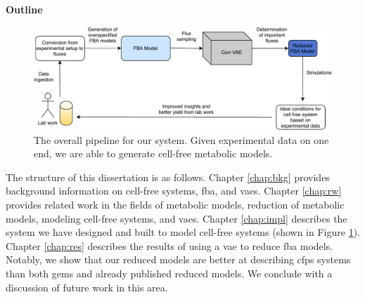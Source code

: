 \textbf{Outline}
\begin{figure}[t!]
\begin{center}
\includegraphics[width=\textwidth]{figs/SystemOverview.pdf}
\end{center}
\caption[The overall pipeline for our system]{The overall pipeline for our system.
Given experimental data on one end, we are able to generate cell-free metabolic models.}
\label{fig:overview}
\end{figure}

The structure of this dissertation is as follows.
Chapter \ref{chap:bkg} provides background information on cell-free systems, \gls{fba}, and \glspl{vae}.
Chapter \ref{chap:rw} provides related work in the fields of metabolic models, reduction of metabolic models, modeling cell-free systems, and \glspl{vae}.
Chapter \ref{chap:impl} describes the system we have designed and built to model cell-free systems (shown in Figure \ref{fig:overview}).
Chapter \ref{chap:res} describes the results of using a \gls{vae} to reduce \gls{fba} models.
Notably, we show that our reduced models are better at describing \gls{cfps} systems than both \glspl{gem} and already published reduced models.
We conclude with a discussion of future work in this area.
